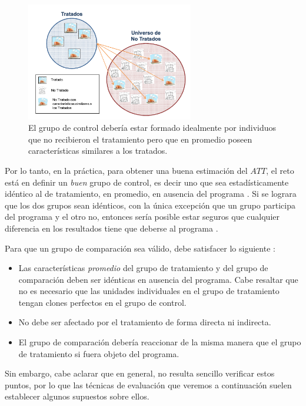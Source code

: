 \documentclass[../../main.tex]{subfiles}
\begin{document}
\begin{figure}[h!]
    \centering
    \includegraphics[width=0.65\textwidth]{figs/grupo-de-control.png}
    \caption{El grupo de control debería estar formado idealmente por individuos que no
    recibieron el tratamiento pero que en promedio poseen características similares a
    los tratados.}
    \label{fig:control-group}
\end{figure}

Por lo tanto, en la práctica, para obtener una buena estimación del \(ATT\), el reto está
en definir un \textit{buen} grupo de control, es decir uno que sea estadísticamente
idéntico al de tratamiento, en promedio, en ausencia del programa \cite{gertler-2016}. Si
se lograra que los dos grupos sean idénticos, con la única excepción que un grupo
participa del programa y el otro no, entonces sería posible estar seguros que cualquier
diferencia en los resultados tiene que deberse al programa \cite{gertler-2016}.

Para que un grupo de comparación sea válido, debe satisfacer lo siguiente \cite{gertler-2016}:
\begin{itemize}
    \item Las características \textit{promedio} del grupo de tratamiento y del grupo de
    comparación deben ser idénticas en ausencia del programa. Cabe resaltar que no es
    necesario que las unidades individuales en el grupo de tratamiento tengan clones
    perfectos en el grupo de control.
    \item No debe ser afectado por el tratamiento de forma directa ni indirecta.
    \item El grupo de comparación debería reaccionar de la misma manera que el grupo de
    tratamiento si fuera objeto del programa.
\end{itemize}
Sin embargo, cabe aclarar que en general, no resulta sencillo verificar estos puntos, por
lo que las técnicas de evaluación que veremos a continuación suelen establecer algunos
supuestos sobre ellos.
\end{document}
